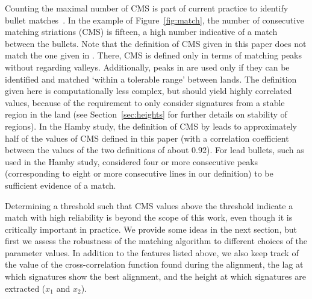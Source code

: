 \documentclass[aoas, preprint]{imsart}\usepackage[]{graphicx}\usepackage[]{color}
\begin{document}
Counting the maximal number of CMS is part of current practice to identify bullet matches~\citep{nichols:1997, nichols:2003, nichols:2003b}. 
In the example of Figure~\ref{fig:match}, the number of consecutive matching striations (CMS) is fifteen, a  high number indicative of a match between the bullets. 
 Note that the definition of CMS given in this paper does not match the one given in \citet{thompson:2013}. There, CMS is defined only in terms of matching peaks without regarding valleys. Additionally, peaks in  \citet{thompson:2013} are  used only if they can be identified and matched `within a tolerable range' between lands. The definition given here is computationally less complex, but should yield highly correlated values, because of the requirement to only consider signatures from a stable region in the land (see Section~\ref{sec:heights} for further details on stability of regions). In the Hamby study, the definition of CMS by \citet{thompson:2013} leads to approximately half of the values of CMS defined in this paper (with a correlation coefficient between the values of the two definitions of about 0.92). 
For lead bullets, such as used in the Hamby study, \citet{biasotti:1959} considered four or more consecutive peaks (corresponding to eight or more consecutive lines in our definition) to be sufficient evidence of a match.  %

Determining a threshold such that CMS values above the threshold indicate a match with high reliability is beyond the scope of this work, even though it is critically important in practice. We provide some ideas in the next section, but first we assess the robustness of the matching algorithm to different choices of the parameter values. 
In addition to the features listed above, we also keep track of the value of the cross-correlation function found during the alignment, the lag at which signatures show the best alignment, and the height at which signatures are extracted ($x_1$ and $x_2$).
\end{document}
